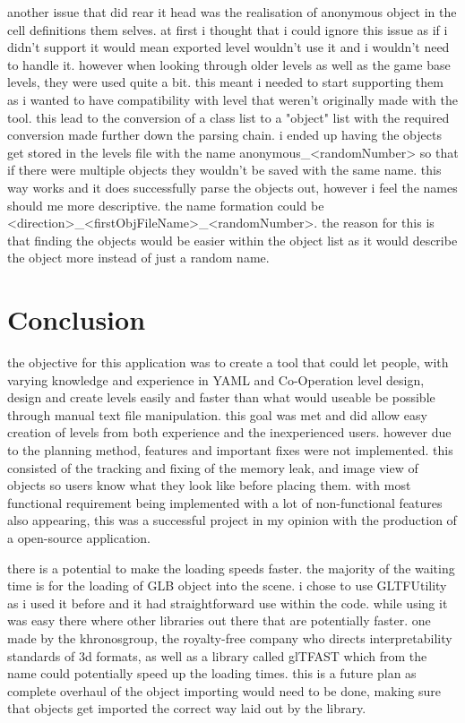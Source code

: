 another issue that did rear it head was the realisation of anonymous object in the cell definitions them selves. at first i thought that i could ignore this issue as if i didn't support it would mean exported level wouldn't use it and i wouldn't need to handle it. however when looking through older levels as well as the game base levels, they were used quite a bit. this meant i needed to start supporting them as i wanted to have compatibility with level that weren't originally made with the tool. this lead to the conversion of a class list to a "object" list with the required conversion made further down the parsing chain. i ended up having the objects get stored in the levels file with the name anonymous\_<randomNumber> so that if there were multiple objects they wouldn't be saved with the same name. this way works and it does successfully parse the objects out, however i feel the names should me more descriptive. the name formation could be <direction>\_<firstObjFileName>\_<randomNumber>. the reason for this is that finding the objects would be easier within the object list as it would describe the object more instead of just a random name.


\section{Conclusion}
the objective for this application was to create a tool that could let people, with varying knowledge and experience in YAML and Co-Operation level design, design and create levels easily and faster than what would useable be possible through manual text file manipulation. this goal was met and did allow easy creation of levels from both experience and the inexperienced users. however due to the planning  method, features and important fixes were not implemented. this consisted of the tracking and fixing of the memory leak, and image view of objects so users know what they look like before placing them. with most functional requirement being implemented with a lot of non-functional features also appearing, this was a successful project in my opinion with the production of a open-source application. 

there is a potential to make the loading speeds faster. the majority of the waiting time is for the loading of GLB object into the scene. i chose to use GLTFUtility as i used it before and it had straightforward use within the code. while using it was easy there where other libraries out there that are potentially faster. one made by the khronosgroup, the royalty-free company who directs interpretability standards of 3d formats, as well as a library called glTFAST which from the name could potentially speed up the loading times. this is a future plan as complete overhaul of the object importing would need to be done, making sure that objects get imported the correct way laid out by the library.

